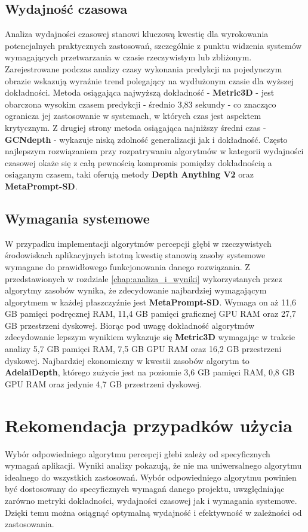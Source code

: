 \subsection{Wydajność czasowa}
Analiza wydajności czasowej stanowi kluczową kwestię dla wyrokowania potencjalnych praktycznych zastosowań, szczególnie z punktu widzenia systemów wymagających przetwarzania w czasie rzeczywistym lub zbliżonym. Zarejestrowane podczas analizy czasy wykonania predykcji na pojedynczym obrazie wskazują wyraźnie trend polegający na wydłużonym czasie dla wyższej dokładności. Metoda osiągająca najwyższą dokładność - \textbf{Metric3D} - jest obarczona wysokim czasem predykcji - średnio 3,83 sekundy - co znacząco ogranicza jej zastosowanie w systemach, w których czas jest aspektem krytycznym. Z drugiej strony metoda osiągająca najniższy średni czas - \textbf{GCNdepth} - wykazuje niską zdolność generalizacji jak i dokładność. Często najlepszym rozwiązaniem przy rozpatrywaniu algorytmów w kategorii wydajności czasowej okaże się z całą pewnością kompromis pomiędzy dokładnością a osiąganym czasem, taki oferują metody \textbf{Depth Anything V2} oraz \textbf{MetaPrompt-SD}.

\subsection{Wymagania systemowe}
W przypadku implementacji algorytmów percepcji głębi w rzeczywistych środowiskach aplikacyjnych istotną kwestię stanowią zasoby systemowe wymagane do prawidłowego funkcjonowania danego rozwiązania. Z przedstawionych w rozdziale \ref{chap:analiza_i_wyniki} wykorzystanych przez algorytmy zasobów wynika, że zdecydowanie najbardziej wymagającym algorytmem w każdej płaszczyźnie jest \textbf{MetaPrompt-SD}. Wymaga on aż 11,6 GB pamięci podręcznej RAM, 11,4 GB pamięci graficznej GPU RAM oraz 27,7 GB przestrzeni dyskowej. Biorąc pod uwagę dokładność algorytmów zdecydowanie lepszym wynikiem wykazuje się \textbf{Metric3D} wymagając w trakcie analizy 5,7 GB pamięci RAM, 7,5 GB GPU RAM oraz 16,2 GB przestrzeni dyskowej. Najbardziej ekonomiczny w kwestii zasobów algorytm to \textbf{AdelaiDepth}, którego zużycie jest na poziomie 3,6 GB pamięci RAM, 0,8 GB GPU RAM oraz jedynie 4,7 GB przestrzeni dyskowej.


\section{Rekomendacja przypadków użycia}
Wybór odpowiedniego algorytmu percepcji głebi zależy od specyficznych wymagań aplikacji. Wyniki analizy pokazują, że nie ma uniwersalnego algorytmu idealnego do wszystkich zastosowań. Wybór odpowiedniego algorytmu powinien być dostosowany do specyficznych wymagań danego projektu, uwzględniając zarówno metryki dokładności, wydajności czasowej jak i wymagania systemowe. Dzięki temu można osiągnąć optymalną wydajność i efektywność w zależności od zastosowania.

